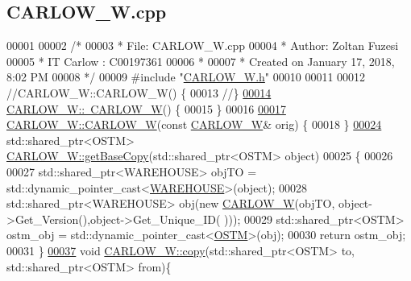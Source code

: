 \hypertarget{_c_a_r_l_o_w___w_8cpp_source}{}\subsection{C\+A\+R\+L\+O\+W\+\_\+\+W.\+cpp}

\begin{DoxyCode}
00001 
00002 \textcolor{comment}{/* }
00003 \textcolor{comment}{ * File:   CARLOW\_W.cpp}
00004 \textcolor{comment}{ * Author: Zoltan Fuzesi}
00005 \textcolor{comment}{ * IT Carlow : C00197361}
00006 \textcolor{comment}{ *}
00007 \textcolor{comment}{ * Created on January 17, 2018, 8:02 PM}
00008 \textcolor{comment}{ */}
00009 \textcolor{preprocessor}{#include "\hyperlink{_c_a_r_l_o_w___w_8h}{CARLOW\_W.h}"}
00010 
00011 
00012 \textcolor{comment}{//CARLOW\_W::CARLOW\_W() \{}
00013 \textcolor{comment}{//\}}
\hypertarget{_c_a_r_l_o_w___w_8cpp_source.tex_l00014}{}\hyperlink{class_c_a_r_l_o_w___w_aa628d46e58dfd0517f24499eca88138b_aa628d46e58dfd0517f24499eca88138b}{00014} \hyperlink{class_c_a_r_l_o_w___w_aa628d46e58dfd0517f24499eca88138b_aa628d46e58dfd0517f24499eca88138b}{CARLOW\_W::~CARLOW\_W}() \{
00015 \}
00016 
\hypertarget{_c_a_r_l_o_w___w_8cpp_source.tex_l00017}{}\hyperlink{class_c_a_r_l_o_w___w_a267a2792c59f475740a68953c8437205_a267a2792c59f475740a68953c8437205}{00017} \hyperlink{class_c_a_r_l_o_w___w_a8ae6ca6f4db7ea5240322fd27824c55a_a8ae6ca6f4db7ea5240322fd27824c55a}{CARLOW\_W::CARLOW\_W}(\textcolor{keyword}{const} \hyperlink{class_c_a_r_l_o_w___w}{CARLOW\_W}& orig) \{
00018 \}
\hypertarget{_c_a_r_l_o_w___w_8cpp_source.tex_l00024}{}\hyperlink{class_c_a_r_l_o_w___w_a1a76566c3a7c01cf469007741dac6b97_a1a76566c3a7c01cf469007741dac6b97}{00024} std::shared\_ptr<OSTM> \hyperlink{class_c_a_r_l_o_w___w_a1a76566c3a7c01cf469007741dac6b97_a1a76566c3a7c01cf469007741dac6b97}{CARLOW\_W::getBaseCopy}(std::shared\_ptr<OSTM> \textcolor{keywordtype}{object})
00025 \{
00026 
00027     std::shared\_ptr<WAREHOUSE> objTO = std::dynamic\_pointer\_cast<\hyperlink{class_w_a_r_e_h_o_u_s_e}{WAREHOUSE}>(object);
00028     std::shared\_ptr<WAREHOUSE> obj(\textcolor{keyword}{new} \hyperlink{class_c_a_r_l_o_w___w_a8ae6ca6f4db7ea5240322fd27824c55a_a8ae6ca6f4db7ea5240322fd27824c55a}{CARLOW\_W}(objTO, object->Get\_Version(),\textcolor{keywordtype}{object}->Get\_Unique\_ID(
      )));
00029     std::shared\_ptr<OSTM> ostm\_obj = std::dynamic\_pointer\_cast<\hyperlink{class_o_s_t_m}{OSTM}>(obj);
00030     \textcolor{keywordflow}{return} ostm\_obj;
00031 \}
\hypertarget{_c_a_r_l_o_w___w_8cpp_source.tex_l00037}{}\hyperlink{class_c_a_r_l_o_w___w_ac91cb7cbae77752e334e273b97fb988b_ac91cb7cbae77752e334e273b97fb988b}{00037} \textcolor{keywordtype}{void} \hyperlink{class_c_a_r_l_o_w___w_ac91cb7cbae77752e334e273b97fb988b_ac91cb7cbae77752e334e273b97fb988b}{CARLOW\_W::copy}(std::shared\_ptr<OSTM> to, std::shared\_ptr<OSTM> from)\{

\end{DoxyCode}
